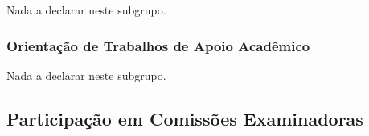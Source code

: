\documentclass[a4paper,oneside,10pt]{article}
\begin{document}
Nada a declarar neste subgrupo.
%
%


\subsubsection{Orienta\c{c}\~{a}o de Trabalhos de Apoio Acad\^{e}mico}
\vspace{0.3cm}

Nada a declarar neste subgrupo.
%
%

\subsection{Participa\c{c}\~{a}o em Comiss\~{o}es Examinadoras}
\vspace{0.3cm}
\end{document}
